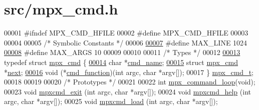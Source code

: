 \hypertarget{mpx__cmd_8h_source}{
\section{src/mpx\_\-cmd.h}
}

\begin{DoxyCode}
00001 \textcolor{preprocessor}{#ifndef MPX\_CMD\_HFILE}
00002 \textcolor{preprocessor}{}\textcolor{preprocessor}{#define MPX\_CMD\_HFILE}
00003 \textcolor{preprocessor}{}
00004 
00005 \textcolor{comment}{/* Symbolic Constants */} 
00006 
\hypertarget{mpx__cmd_8h_source_l00007}{}\hyperlink{mpx__cmd_8h_a842ed03f27719bc87666bfd1f75415b8}{00007} \textcolor{preprocessor}{#define MAX\_LINE        1024}
\hypertarget{mpx__cmd_8h_source_l00008}{}\hyperlink{mpx__cmd_8h_a29b7451465deac204c5f7cb1f9c6e1fc}{00008} \textcolor{preprocessor}{}\textcolor{preprocessor}{#define MAX\_ARGS        10}
00009 \textcolor{preprocessor}{}
00010 
00011 \textcolor{comment}{/* Types */}
00012 
\hypertarget{mpx__cmd_8h_source_l00013}{}\hyperlink{structmpx__cmd}{00013} \textcolor{keyword}{typedef} \textcolor{keyword}{struct }\hyperlink{structmpx__cmd}{mpx_cmd} \{
\hypertarget{mpx__cmd_8h_source_l00014}{}\hyperlink{structmpx__cmd_aeae73296151ffcec319820f4d8399e51}{00014}         \textcolor{keywordtype}{char} *\hyperlink{structmpx__cmd_aeae73296151ffcec319820f4d8399e51}{cmd_name};
\hypertarget{mpx__cmd_8h_source_l00015}{}\hyperlink{structmpx__cmd_a863c991d0d31b283791615b5f5fe03bb}{00015}         \textcolor{keyword}{struct }\hyperlink{structmpx__cmd}{mpx_cmd} *\hyperlink{structmpx__cmd_a863c991d0d31b283791615b5f5fe03bb}{next};
\hypertarget{mpx__cmd_8h_source_l00016}{}\hyperlink{structmpx__cmd_ad35d459cc43aac3f75fb308e07572253}{00016}         void (*\hyperlink{structmpx__cmd_ad35d459cc43aac3f75fb308e07572253}{cmd_function})(\textcolor{keywordtype}{int} argc, \textcolor{keywordtype}{char} *argv[]);
00017 \} \hyperlink{structmpx__cmd}{mpx_cmd_t};
00018 
00019 
00020 \textcolor{comment}{/* Prototypes */}
00021 
00022 \textcolor{keywordtype}{int}             \hyperlink{mpx__cmd_8c_ab2f64c5ce0432edca230a87739501703}{mpx_command_loop}(\textcolor{keywordtype}{void});
00023 \textcolor{keywordtype}{void}    \hyperlink{mpx__cmd_8c_ac303fbf0480d6050f91c6d7ac960d00c}{mpxcmd_exit}             (\textcolor{keywordtype}{int} argc, \textcolor{keywordtype}{char} *argv[]);
00024 \textcolor{keywordtype}{void}    \hyperlink{mpx__cmd_8c_ae9b1349cfcfc34815e87cae5330660e8}{mpxcmd_help}             (\textcolor{keywordtype}{int} argc, \textcolor{keywordtype}{char} *argv[]);
00025 \textcolor{keywordtype}{void}    \hyperlink{mpx__cmd_8c_ab121952706478a3ce5951ab91298d391}{mpxcmd_load}             (\textcolor{keywordtype}{int} argc, \textcolor{keywordtype}{char} *argv[]);

\end{DoxyCode}
